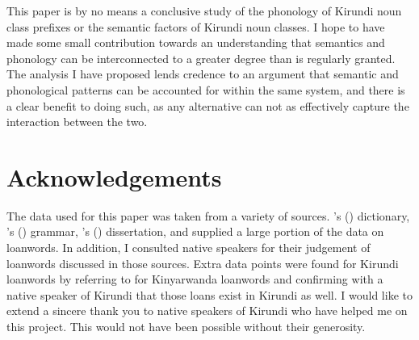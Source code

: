 \documentclass[output=paper,colorlinks,citecolor=brown,
]{langscibook}
\begin{document}
This paper is by no means a conclusive study of the phonology of Kirundi noun class prefixes or the semantic factors of Kirundi noun classes. I hope to have made some small contribution towards an understanding that semantics and phonology can be interconnected to a greater degree than is regularly granted. The analysis I have proposed lends credence to an argument that semantic and phonological patterns can be accounted for within the same system, and there is a clear benefit to doing such, as any alternative can not as effectively capture the interaction between the two.






\section*{Acknowledgements}
The data used for this paper was taken from a variety of sources. \citeauthor{cox1969dictionary}'s (\citeyear{cox1969dictionary}) dictionary, \citeauthor{zorc2007kinyarwanda}'s (\citeyear{zorc2007kinyarwanda}) grammar, \citeauthor{niyondagara1993kirundi}'s (\citeyear{niyondagara1993kirundi}) dissertation, and \citet{Rwamo2019} supplied a large portion of the data on loanwords. In addition, I consulted native speakers for their judgement of loanwords discussed in those sources. Extra data points were found for Kirundi loanwords by referring to \citet{Kayigema} for Kinyarwanda loanwords and confirming with a native speaker of Kirundi that those loans exist in Kirundi as well. I would like to extend a sincere thank you to native speakers of Kirundi who have helped me on this project. This would not have been possible without their generosity.


\sloppy %

\printbibliography[heading=subbibliography,notkeyword=this]
\end{document}
